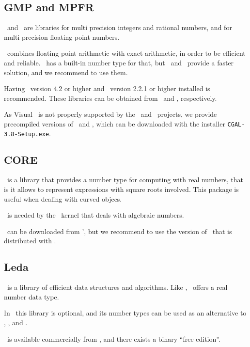\subsection{GMP and MPFR \label{thirdparty:GMP} \label{thirdparty:MPFR}}

\gmp\ and \mpfr\ are libraries for multi precision integers and rational numbers,
and for multi precision floating point numbers.

\cgal\ combines floating point arithmetic with exact arithmetic,
in order to be efficient and reliable.  \cgal\ has a built-in 
number type for that, but \gmp\ and \mpfr\ provide a faster
solution, and we recommend to use them.

Having \gmp\ version 4.2 or higher and \mpfr\ version 2.2.1 or higher
installed is recommended. These libraries can be obtained from
\gmppage\ and \mpfrpage, respectively. 

As Visual \CC\ is not properly
supported by the \gmp\ and \mpfr\ projects, we provide precompiled versions
of \gmp\ and \mpfr, which can be downloaded with the installer
\texttt{CGAL-3.8-Setup.exe}.

\subsection{CORE \label{thirdparty:Core}}

\core\ is a library that provides a number type for computing with real
numbers, that is it allows to represent expressions with square roots
involved. This package is useful when dealing with curved objecs.

\core\ is needed by the \cgal\ kernel that deals with algebraic
numbers.

\core\ can be downloaded from \corepage',
but we recommend to use the version of \core\ that  is distributed
with \cgal.

\subsection{Leda \label{thirdparty:Leda}}

\leda\ is a library of efficient data structures and
algorithms. Like \core, \leda\ offers a real number data type.  

In \cgal\ this library is optional, and its number types can 
be used as an alternative to \gmp, \mpfr, and \core .

\leda\ is available commercially from \ledapage,
and there exists a binary ``free edition''.



